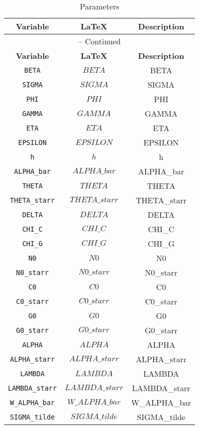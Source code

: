 \begin{center}
\begin{longtable}{ccc}
\caption{Parameters}\\%
\hline%
\multicolumn{1}{c}{\textbf{Variable}} &
\multicolumn{1}{c}{\textbf{\LaTeX}} &
\multicolumn{1}{c}{\textbf{Description}}\\%
\hline\hline%
\endfirsthead
\multicolumn{3}{c}{{\tablename} \thetable{} -- Continued}\\%
\hline%
\multicolumn{1}{c}{\textbf{Variable}} &
\multicolumn{1}{c}{\textbf{\LaTeX}} &
\multicolumn{1}{c}{\textbf{Description}}\\%
\hline\hline%
\endhead
\texttt{BETA} & $BETA$ & BETA\\
\texttt{SIGMA} & $SIGMA$ & SIGMA\\
\texttt{PHI} & $PHI$ & PHI\\
\texttt{GAMMA} & $GAMMA$ & GAMMA\\
\texttt{ETA} & $ETA$ & ETA\\
\texttt{EPSILON} & $EPSILON$ & EPSILON\\
\texttt{h} & $h$ & h\\
\texttt{ALPHA\_bar} & $ALPHA\_bar$ & ALPHA\_bar\\
\texttt{THETA} & $THETA$ & THETA\\
\texttt{THETA\_starr} & $THETA\_starr$ & THETA\_starr\\
\texttt{DELTA} & $DELTA$ & DELTA\\
\texttt{CHI\_C} & $CHI\_C$ & CHI\_C\\
\texttt{CHI\_G} & $CHI\_G$ & CHI\_G\\
\texttt{N0} & $N0$ & N0\\
\texttt{N0\_starr} & $N0\_starr$ & N0\_starr\\
\texttt{C0} & $C0$ & C0\\
\texttt{C0\_starr} & $C0\_starr$ & C0\_starr\\
\texttt{G0} & $G0$ & G0\\
\texttt{G0\_starr} & $G0\_starr$ & G0\_starr\\
\texttt{ALPHA} & $ALPHA$ & ALPHA\\
\texttt{ALPHA\_starr} & $ALPHA\_starr$ & ALPHA\_starr\\
\texttt{LAMBDA} & $LAMBDA$ & LAMBDA\\
\texttt{LAMBDA\_starr} & $LAMBDA\_starr$ & LAMBDA\_starr\\
\texttt{W\_ALPHA\_bar} & $W\_ALPHA\_bar$ & W\_ALPHA\_bar\\
\texttt{SIGMA\_tilde} & $SIGMA\_tilde$ & SIGMA\_tilde\\

\end{longtable}
\end{center}
